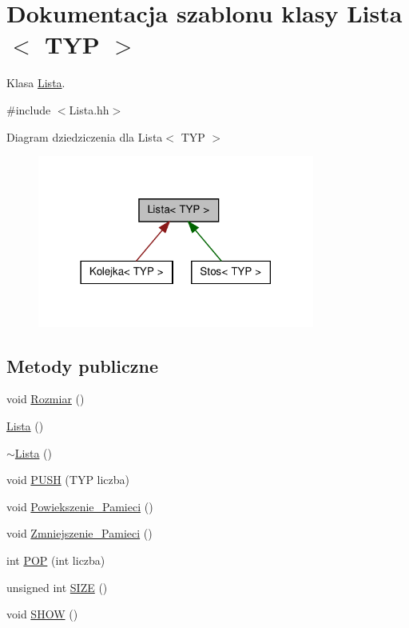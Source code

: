 \hypertarget{class_lista}{
\section{Dokumentacja szablonu klasy Lista$<$ TYP $>$}
\label{class_lista}
}


Klasa \hyperlink{class_lista}{Lista}.  




{\ttfamily \#include $<$Lista.hh$>$}



Diagram dziedziczenia dla Lista$<$ TYP $>$
\nopagebreak
\begin{figure}[H]
\begin{center}
\leavevmode
\includegraphics[width=258pt]{class_lista__inherit__graph}
\end{center}
\end{figure}
\subsection*{Metody publiczne}
\begin{DoxyCompactItemize}
\item 
void \hyperlink{class_lista_a81ea74ac702b5ccbe3c88b3149887975}{Rozmiar} ()
\item 
\hyperlink{class_lista_ae2559bf0c96569265d5f9f7f9cd4cb3a}{Lista} ()
\item 
\hyperlink{class_lista_a7271d867e38a838c25ffb5aa6b73faef}{$\sim$Lista} ()
\item 
void \hyperlink{class_lista_a5c21bab22b627c729ad0c90e1f835901}{PUSH} (TYP liczba)
\item 
void \hyperlink{class_lista_a6d81ca560734ac6fce5c503090b7b250}{Powiekszenie\_\-Pamieci} ()
\item 
void \hyperlink{class_lista_aa648e807e5daab59523ffbef5ca80d00}{Zmniejszenie\_\-Pamieci} ()
\item 
int \hyperlink{class_lista_aba90f4f62ac00f38ecf71ba3c9f1b40e}{POP} (int liczba)
\item 
unsigned int \hyperlink{class_lista_a4f10ca015c6b34a322dbc1c93e313c07}{SIZE} ()
\item 
void \hyperlink{class_lista_a89bbb449a047593eebce602a449ac1e7}{SHOW} ()
\end{DoxyCompactItemize}

